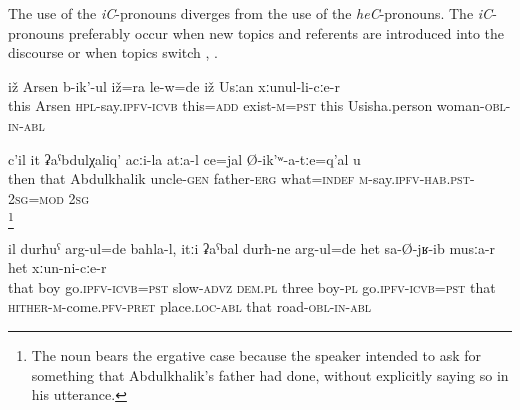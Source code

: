 The use of the \textit{iC}-pronouns diverges from the use of the \textit{heC}-pronouns. The \textit{iC}-pronouns preferably occur when new topics and referents are introduced into the discourse  or when topics switch , .
%
\begin{exe}
	\ex	\label{And this man called Arsen, he was also there, with his wife from Usisha.}
	\gll	iž	Arsen	b-ik'-ul	iž=ra	le-w=de	iž	Usːan	xːunul-li-cːe-r\\
	this	Arsen	\textsc{hpl}-say.\textsc{ipfv}-\textsc{icvb} this=\textsc{add}	exist-\textsc{m}=\textsc{pst}	this	Usisha.person	woman-\textsc{obl}-\textsc{in}-\textsc{abl}\\
	\glt	{}

		\label{What did you say about uncle Abdulkhalik's father?}
	\sn
	\gll	c'il	it	ʡaˁbdulχaliq'	acːi-la	atːa-l	ce=jal	Ø-ik'ʷ-a-tːe=q'al	u\\
		then	that	Abdulkhalik	uncle-\textsc{gen}	father-\textsc{erg}	what=\textsc{indef}	\textsc{m}-say.\textsc{ipfv}-\textsc{hab}.\textsc{pst}-\textsc{2sg}=\textsc{mod}	\textsc{2sg}\\
	\glt	{}\footnote{The noun  bears the ergative case because the speaker intended to ask for something that Abdulkhalik's father had done, without explicitly saying so in his utterance.}

		\label{And the boy went slowly away, and the three boys went there to that place, on that road.}
	\sn
	\gll	il	durħuˁ	arg-ul=de	bahla-l,	itːi	ʡaˁbal	durħ-ne	arg-ul=de	het	sa-Ø-jʁ-ib	musːa-r het	xːun-ni-cːe-r\\
		that	boy	go.\textsc{ipfv}-\textsc{icvb}=\textsc{pst}	slow-\textsc{advz}	\textsc{dem.pl} three	boy-\textsc{pl}	go.\textsc{ipfv}-\textsc{icvb}=\textsc{pst}	that \textsc{hither-m}-come.\textsc{pfv}-\textsc{pret} place.\textsc{loc}-\textsc{abl} that	road-\textsc{obl-in}-\textsc{abl} \\
	\glt	{}

\end{exe}

